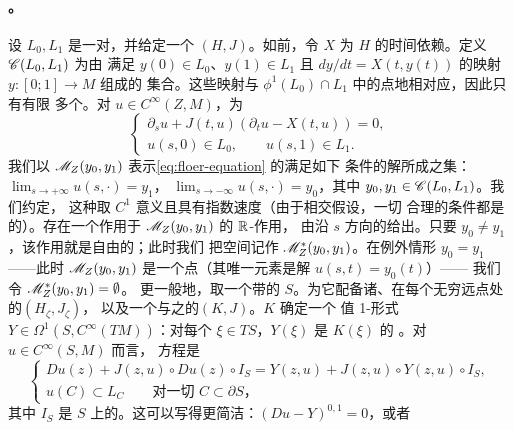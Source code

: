 \paragraph{\trInhomogeneous\trPseudoholomorphicMap。}\label{sub:inhomogeneous-maps}
设 $L_0,L_1$ 是一对\trExact\trLagrange\trSubmanifold，并给定一个\trFloerDatum{}%
$(H,J)$。如前，令 $X$ 为 $H$ 的时间依赖\trVectorField。定义 $\mathscr{C}(L_0,L_1)$ 为由
满足 $y(0)\in L_0$、$y(1)\in L_1$ 且 $dy/dt=X(t,y(t))$ 的映射 $y:[0;1]\to M$ 组成的
集合。这些映射与 $\phi^1(L_0)\cap L_1$ 中的点\trBijective{}地相对应，因此只有有限
多个。对 $u\in C^\infty(Z,M)$，\trFloerEquation{}为
\begin{equation}\label{eq:floer-equation}
\begin{cases}
\partial_s u+J(t,u)(\partial_t u-X(t,u))=0,\\
u(s,0)\in L_0,\qquad u(s,1)\in L_1.
\end{cases}
\end{equation}
我们以 $\mathscr{M}_Z(y_0,y_1)$ 表示\eqref{eq:floer-equation} 的满足如下\trAsymptotic%
{}条件的解所成之集：$\lim_{s\to+\infty}u(s,\cdot)=y_1$，
$\lim_{s\to-\infty}u(s,\cdot)=y_0$，其中 $y_0,y_1\in\mathscr{C}(L_0,L_1)$。我们约定，
这种\trConvergence{}取 $C^1$ 意义且具有指数速度（由于\trTransverse{}相交假设，一切
合理的\trConvergence{}条件都是\trEquivalence{}的）。存在一个作用于
$\mathscr{M}_Z(y_0,y_1)$ 的 $\mathbb{R}$-作用，
由沿 $s$ 方向的\trTranslation{}给出。只要 $y_0\ne y_1$，该作用就是自由的；此时我们
把\trQuotient{}空间记作 $\mathscr{M}^*_Z(y_0,y_1)$。在例外情形 $y_0=y_1$——此时
$\mathscr{M}_Z(y_0,y_1)$ 是一个点（其唯一元素是\trStationary{}解 $u(s,t)=y_0(t)$）——
我们令 $\mathscr{M}^*_Z(y_0,y_1)=\emptyset$。
更一般地，取一个带\trLagrange\trLabel{}的\trPointedBoundary\trRiemann\trSurface{}%
$S$。为它配备诸\trStriplikeEnd、在每个无穷远点处的\trFloerDatum{}$(H_\zeta,J_\zeta)$，
以及一个与之\trCompatible{}的\trPerturbationDatum{}$(K,J)$。$K$ 确定一个%
\trVectorField{}值 1-形式
$Y\in\Omega^1(S,C^\infty(TM))$：对每个 $\xi\in TS$，$Y(\xi)$ 是 $K(\xi)$ 的%
\trHamiltonianVectorField。对 $u\in C^\infty(S,M)$ 而言，\trInhomogeneous%
\trPseudoholomorphicMap{}方程是
\begin{equation}\label{eq:inhomogeneous-equation}
\begin{cases}
Du(z)+J(z,u)\circ Du(z)\circ I_S=Y(z,u)+J(z,u)\circ Y(z,u)\circ I_S,\\
u(C)\subset L_C\qquad\text{对一切 }C\subset\partial S\text{，}
\end{cases}
\end{equation}
其中 $I_S$ 是 $S$ 上的\trComplexStructure。这可以写得更简洁：$(Du-Y)^{0,1}=0$，或者
